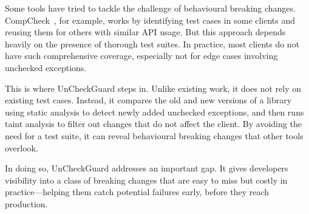 Some tools have tried to tackle the challenge of behavioural breaking changes. CompCheck~\cite{CompCheck}, for example, works by identifying test cases in some clients and reusing them for others with similar API usage. But this approach depends heavily on the presence of thorough test suites. In practice, most clients do not have such comprehensive coverage, especially not for edge cases involving unchecked exceptions.

This is where UnCheckGuard steps in. Unlike existing work, it does not rely on existing test cases. Instead, it compares the old and new versions of a library using static analysis to detect newly added unchecked exceptions, and then runs taint analysis to filter out changes that do not affect the client. By avoiding the need for a test suite, it can reveal behavioural breaking changes that other tools overlook.

In doing so, UnCheckGuard addresses an important gap. It gives developers visibility into a class of breaking changes that are easy to miss but costly in practice—helping them catch potential failures early, before they reach production.
